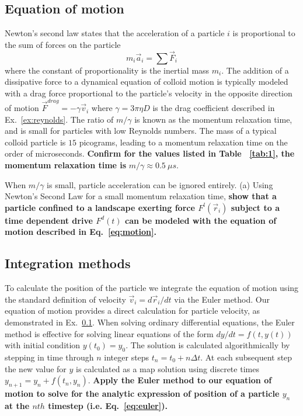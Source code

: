 \documentclass[twocolumn,preprintnumbers,amsmath,amssymb,aps,prb]{revtex4}
\begin{document}
\label{ex:reynolds}

\subsection{Equation of motion}
  \label{ex:n2l}
  Newton's second law states that
  the acceleration of a particle $i$
  is proportional to 
  the sum of forces on the particle 
  \begin{equation}
  m_i \vec{a}_i = \sum \vec{F}_i
  \label{eq:n2l}
  \end{equation}
  where the constant of proportionality is the
  inertial mass $m_i$.  
  The addition of a dissipative force to a dynamical equation 
  of colloid motion 
  is typically modeled
  with a drag force proportional to the particle's velocity
  in the opposite direction of motion 
  $\vec{F}^{drag} = - \gamma \vec{v}_i$
  where $\gamma = 3 \pi \eta D$ is the drag coefficient
  described in Ex.~\ref{ex:reynolds}.
  The ratio of $m/\gamma$ is %
  known as the momentum relaxation time, %
  and is small for
  particles with low Reynolds numbers.
  The mass of a
  typical colloid particle is $15$ picograms,
  leading to a momentum relaxation time
  on the order of microseconds.
  {\bf Confirm for the values listed in Table ~\ref{tab:1},
  the momentum relaxation time is }
  $m/\gamma \approx 0.5 ~\mu s$. 
  
  When $m/\gamma$ is small,
  particle acceleration can be ignored
  entirely.
  (a) Using Newton's Second Law for
  a small momentum relaxation time, 
  {\bf show that a particle confined to a landscape exerting force
  $F^l(\vec{r}_i)$ subject to a time dependent drive $F^d(t)$
  can be modeled with the equation of motion described in 
  Eq.~\ref{eq:motion}. }

  \subsection{Integration methods}
  \label{ex:euler}
  To calculate the position of the particle we
  integrate the equation of motion using
  the standard definition of velocity
  $\vec{v}_i = d\vec{r}_i/dt$ 
  via the 
  Euler method. 
  Our equation of motion provides
  a direct calculation for particle velocity,
  as demonstrated in Ex.~\ref{ex:n2l}.  
  When solving ordinary differential equations,
  the Euler method is effective for solving linear equations
  of the form
  $dy/dt = f(t,y(t))$ with initial condition $y(t_0) = y_0$.
  The solution is calculated algorithmically
  by stepping in time through $n$ integer steps
  $t_n = t_0 + n \Delta t$.
  At each subsequent step the new
  value for $y$ is calculated as a map solution using
  discrete times 
  $y_{n+1} = y_n + f(t_n,y_n)$.
  {\bf Apply the Euler method to our equation
  of motion to solve for the analytic expression
  of position of a particle
  $y_n$ at the $nth$ timestep (i.e. Eq.~\ref{eq:euler}).}
    
\end{document}
